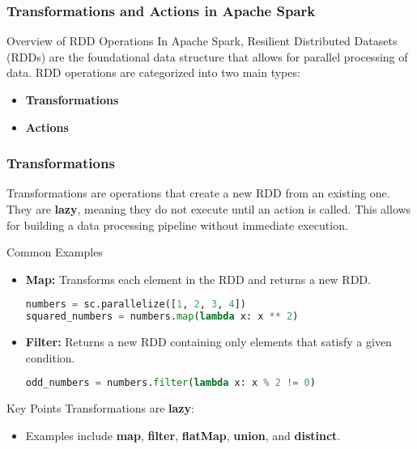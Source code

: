 \documentclass[aspectratio=169]{beamer}
\begin{document}
\begin{frame}[fragile]
    \frametitle{Transformations and Actions in Apache Spark}
    \begin{block}{Overview of RDD Operations}
        In Apache Spark, Resilient Distributed Datasets (RDDs) are the foundational data structure that allows for parallel processing of data. RDD operations are categorized into two main types:
        \begin{itemize}
            \item \textbf{Transformations}
            \item \textbf{Actions}
        \end{itemize}
    \end{block}
\end{frame}

\begin{frame}[fragile]
    \frametitle{Transformations}
    Transformations are operations that create a new RDD from an existing one. They are \textbf{lazy}, meaning they do not execute until an action is called. This allows for building a data processing pipeline without immediate execution.

    \begin{block}{Common Examples}
        \begin{itemize}
            \item \textbf{Map:} Transforms each element in the RDD and returns a new RDD.
            \begin{lstlisting}[language=Python]
numbers = sc.parallelize([1, 2, 3, 4])
squared_numbers = numbers.map(lambda x: x ** 2)
            \end{lstlisting}
            
            \item \textbf{Filter:} Returns a new RDD containing only elements that satisfy a given condition.
            \begin{lstlisting}[language=Python]
odd_numbers = numbers.filter(lambda x: x % 2 != 0)
            \end{lstlisting}
        \end{itemize}
    \end{block}

    \begin{block}{Key Points}
        Transformations are \textbf{lazy}:
        \begin{itemize}
            \item Examples include \textbf{map}, \textbf{filter}, \textbf{flatMap}, \textbf{union}, and \textbf{distinct}.
        \end{itemize}
    \end{block}
\end{frame}
\end{document}
